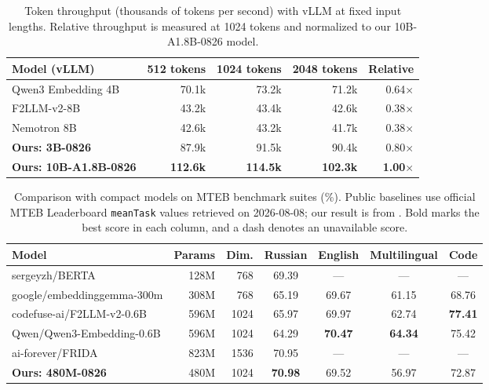 \documentclass[11pt]{article}
\begin{document}
\begin{table}[!t]
  \caption{Token throughput (thousands of tokens per second) with vLLM at fixed input lengths. Relative throughput is measured at 1024 tokens and normalized to our 10B-A1.8B-0826 model.}
  \label{tab:throughput}
  \centering
  \small
  \setlength{\tabcolsep}{5pt}
  \begin{tabular}{p{8.0cm}rrrr}
    \toprule
    \textbf{Model (vLLM)} & \textbf{512 tokens} & \textbf{1024 tokens} & \textbf{2048 tokens} & \textbf{Relative} \\
    \midrule
    Qwen3 Embedding 4B
      & 70.1k & 73.2k & 71.2k & 0.64$\times$ \\
    F2LLM-v2-8B
      & 43.2k & 43.4k & 42.6k & 0.38$\times$ \\
    Nemotron 8B
      & 42.6k & 43.2k & 41.7k & 0.38$\times$ \\
    \midrule
    \textbf{Ours: 3B-0826}
      & 87.9k & 91.5k & 90.4k & 0.80$\times$ \\
    \textbf{Ours: 10B-A1.8B-0826}
      & \textbf{112.6k} & \textbf{114.5k} & \textbf{102.3k} & \textbf{1.00$\times$} \\
    \bottomrule
  \end{tabular}
\end{table}

\begin{table}[!t]
  \caption{Comparison with compact models on MTEB benchmark suites (\%). Public baselines use official MTEB Leaderboard \texttt{meanTask} values retrieved on 2026-08-08; our result is from . Bold marks the best score in each column, and a dash denotes an unavailable score.}
  \label{tab:baselines}
  \centering
  \small
  \setlength{\tabcolsep}{5pt}
  \begin{tabular}{lrrcccc}
    \toprule
    \textbf{Model} & \textbf{Params} & \textbf{Dim.} & \textbf{Russian} & \textbf{English} & \textbf{Multilingual} & \textbf{Code} \\
    \midrule
    sergeyzh/BERTA                              & 128M & 768  & 69.39 & --- & --- & --- \\
    google/embeddinggemma-300m                  & 308M & 768  & 65.19 & 69.67 & 61.15 & 68.76 \\
    codefuse-ai/F2LLM-v2-0.6B                   & 596M & 1024 & 65.97 & 69.97 & 62.74 & \textbf{77.41} \\
    Qwen/Qwen3-Embedding-0.6B                   & 596M & 1024 & 64.29 & \textbf{70.47} & \textbf{64.34} & 75.42 \\
    ai-forever/FRIDA                            & 823M & 1536 & 70.95 & --- & --- & --- \\
    \midrule
    \textbf{Ours: 480M-0826}                    & 480M & 1024 & \textbf{70.98} & 69.52 & 56.97 & 72.87 \\
    \bottomrule
  \end{tabular}
\end{table}
\end{document}
